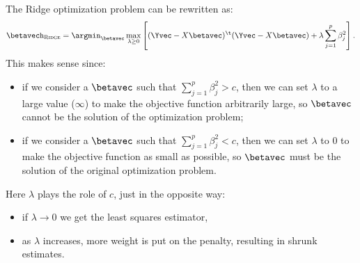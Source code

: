 The Ridge optimization problem can be rewritten as:
\begin{equation}
    \betavech_{\textsc{Ridge}} = \argmin_{\betavec} \max_{\lambda \geq 0} \left[ (\Yvec - X\betavec)^\t (\Yvec - X\betavec) + \lambda \sum_{j=1}^p \beta_j^2 \right].
\end{equation}
This makes sense since:
\begin{itemize}
    \item if we consider a $\betavec$ such that $\sum_{j=1}^p \beta_j^2 > c$, then we can set $\lambda$ to a large value ($\infty$) to make the objective function arbitrarily large, so $\betavec$ cannot be the solution of the optimization problem;
    \item if we consider a $\betavec$ such that $\sum_{j=1}^p \beta_j^2 < c$, then we can set $\lambda$ to $0$ to make the objective function as small as possible, so $\betavec$ must be the solution of the original optimization problem.
\end{itemize}
Here $\lambda$ plays the role of $c$, just in the opposite way:
\begin{itemize}
    \item if $\lambda \to 0$ we get the least squares estimator,
    \item as $\lambda$ increases, more weight is put on the penalty, resulting in shrunk estimates.
\end{itemize}

